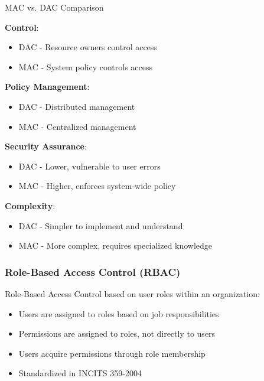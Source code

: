 \begin{theorem}{MAC vs. DAC Comparison}

    \begin{minipage}{0.45\linewidth}
\textbf{Control}:
    \begin{itemize}
        \item DAC - Resource owners control access
        \item MAC - System policy controls access
    \end{itemize}
\textbf{Policy Management}:
    \begin{itemize}
        \item DAC - Distributed management
        \item MAC - Centralized management
    \end{itemize}
\end{minipage}
    \begin{minipage}{0.55\linewidth}
\textbf{Security Assurance}:
    \begin{itemize}
        \item DAC - Lower, vulnerable to user errors
        \item MAC - Higher, enforces system-wide policy
    \end{itemize}
\textbf{Complexity}:
    \begin{itemize}
        \item DAC - Simpler to implement and understand
        \item MAC - More complex, requires specialized knowledge
    \end{itemize}
    \end{minipage}

\end{theorem}

\raggedcolumns
\columnbreak




\subsubsection{Role-Based Access Control (RBAC)}

\begin{definition}{Role-Based Access Control}
based on user roles within an organization:
\begin{itemize}
    \item Users are assigned to roles based on job responsibilities
    \item Permissions are assigned to roles, not directly to users
    \item Users acquire permissions through role membership
    \item Standardized in INCITS 359-2004
\end{itemize}
\end{definition}


